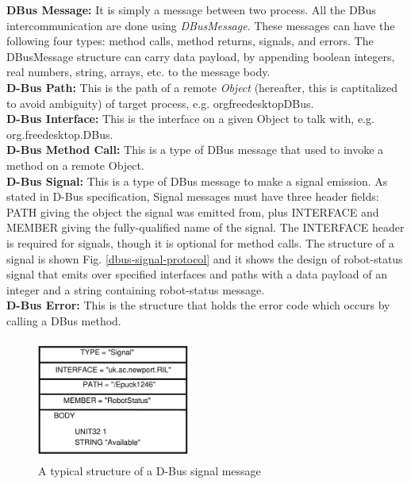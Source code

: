 \documentclass{ifacconf}
\begin{document}
\textbf{DBus Message: }
It is simply a message between two process. All the DBus intercommunication are done using \textit{DBusMessage}. These messages can have the following four types: method calls, method returns, signals, and errors. The DBusMessage structure can carry data payload, by appending boolean integers, real numbers, string, arrays, etc. to the message body.\\ 
\textbf{D-Bus Path: }
This is the path of a remote \textit{Object} (hereafter, this is captitalized to avoid ambiguity) of target process, e.g. \/org\/freedesktop\/DBus.\\
\textbf{D-Bus Interface: }
This is the interface on a given Object to talk with, e.g. org.freedesktop.DBus.\\
\textbf{D-Bus Method Call: }
This is a type of DBus message that used to invoke a method on a remote Object.\\
\textbf{D-Bus Signal: }
This is a type of DBus message to make a signal emission. As stated in D-Bus specification, Signal messages must have three header fields: PATH giving the object the signal was emitted from, plus INTERFACE and MEMBER giving the fully-qualified name of the signal. The INTERFACE header is required for signals, though it is optional for method calls. The structure of a signal is shown Fig. \ref{dbus-signal-protocol} and it shows the design of robot-status signal that emits over specified interfaces and paths with a data payload of an integer and a string containing robot-status message.\\
\textbf{D-Bus Error: }
This is the structure that holds the error code which occurs by calling a DBus method.
\begin{figure}
\begin{center}
\includegraphics[width=5cm,height=4cm]{./dia-files/dbus-signal-protocol} %
\caption{A typical structure of a D-Bus signal message} 
\label{fig:dbus-signal-protocol}
\end{center}
\end{figure}
\end{document}
